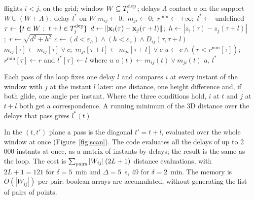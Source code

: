 \begin{algorithm}[htbp]
\caption{Phase 2: scan of one candidate pair}\label{alg:scan}
\begin{algorithmic}[1]
\Require flights $i<j$, on the grid; window $W\subseteq T^{\mathrm{dep}}_i$; delays $\Lambda$
\Ensure contact $a$ on the support $W\cup(W+\Lambda)$; delay $l^*$ on $W$
\State $m_{ij}\gets0$;\ $m_{ji}\gets0$;\ $r^{\min}\gets+\infty$;\ $l^*\gets$ undefined
  \State $\tau\gets\{t\in W:\ t+l\in T^{\mathrm{dep}}_j\}$ 
  \State $d\gets\|\mathbf{x}_i(\tau)-\mathbf{x}_j(\tau+l)\|$;\ $h\gets|z_i(\tau)-z_j(\tau+l)|$;\ $r\gets\sqrt{d^2+h^2}$
  \State $c\gets(d<\varepsilon_h)\wedge(h<\varepsilon_z)\wedge D_{ij}(\tau,\tau+l)$
  \State $m_{ij}[\tau]\gets m_{ij}[\tau]\vee c$;\ $m_{ji}[\tau+l]\gets m_{ji}[\tau+l]\vee c$
  \State $u\gets c\wedge(r<r^{\min}[\tau])$;\ $r^{\min}[\tau]\gets r$ and $l^*[\tau]\gets l$ where $u$
\EndFor
\State $a(t)\gets m_{ij}(t)\vee m_{ji}(t)$
\State \Return $a$, $l^*$
\end{algorithmic}
\end{algorithm}

\begin{inwords}
Each pass of the loop fixes one delay $l$ and compares $i$ at every instant of the window with
$j$ at the instant $l$ later: one distance, one height difference and, if both glide, one angle per
instant. Where the three conditions hold, $i$ at $t$ and $j$ at $t+l$ both get a correspondence. A
running minimum of the 3D distance over the delays that pass gives $l^*(t)$.
\end{inwords}

In the $(t,t')$ plane a pass is the diagonal $t'=t+l$, evaluated over the whole window at once
(Figure~\ref{fig:scan}). The code evaluates all the delays of up to 2\,000 instants at once, as a
matrix of instants by delays; the result is the same as the loop. The cost is
$\sum_{\rm pairs}|W_{ij}|\,(2L+1)$ distance evaluations, with $2L+1=121$ for $\delta=5$~min and
$\Delta=5$~s, 49 for $\delta=2$~min. The memory is $O(|W_{ij}|)$ per pair: boolean arrays are
accumulated, without generating the list of pairs of points.

